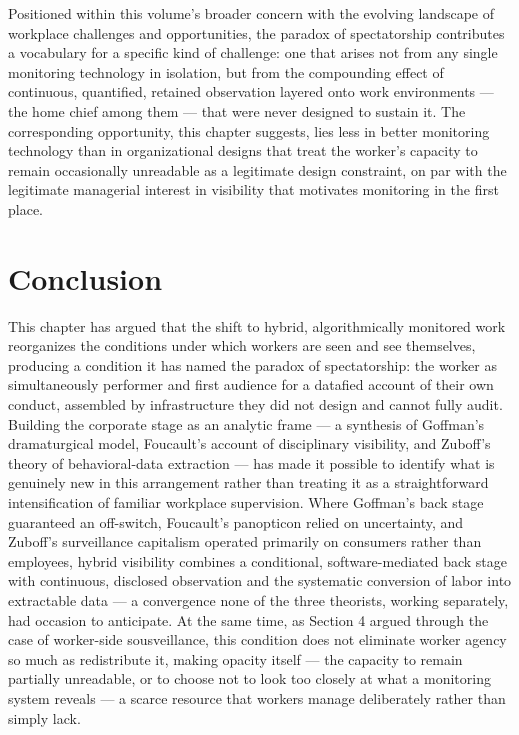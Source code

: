 \documentclass[12pt]{article}
\begin{document}
Positioned within this volume's broader concern with the evolving landscape of workplace challenges and opportunities, the paradox of spectatorship contributes a vocabulary for a specific kind of challenge: one that arises not from any single monitoring technology in isolation, but from the compounding effect of continuous, quantified, retained observation layered onto work environments --- the home chief among them --- that were never designed to sustain it. The corresponding opportunity, this chapter suggests, lies less in better monitoring technology than in organizational designs that treat the worker's capacity to remain occasionally unreadable as a legitimate design constraint, on par with the legitimate managerial interest in visibility that motivates monitoring in the first place.

\section{Conclusion}

This chapter has argued that the shift to hybrid, algorithmically monitored work reorganizes the conditions under which workers are seen and see themselves, producing a condition it has named the paradox of spectatorship: the worker as simultaneously performer and first audience for a datafied account of their own conduct, assembled by infrastructure they did not design and cannot fully audit. Building the corporate stage as an analytic frame --- a synthesis of Goffman's dramaturgical model, Foucault's account of disciplinary visibility, and Zuboff's theory of behavioral-data extraction --- has made it possible to identify what is genuinely new in this arrangement rather than treating it as a straightforward intensification of familiar workplace supervision. Where Goffman's back stage guaranteed an off-switch, Foucault's panopticon relied on uncertainty, and Zuboff's surveillance capitalism operated primarily on consumers rather than employees, hybrid visibility combines a conditional, software-mediated back stage with continuous, disclosed observation and the systematic conversion of labor into extractable data --- a convergence none of the three theorists, working separately, had occasion to anticipate. At the same time, as Section 4 argued through the case of worker-side sousveillance, this condition does not eliminate worker agency so much as redistribute it, making opacity itself --- the capacity to remain partially unreadable, or to choose not to look too closely at what a monitoring system reveals --- a scarce resource that workers manage deliberately rather than simply lack.
\end{document}
